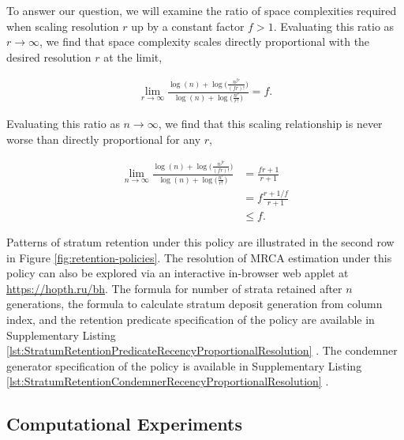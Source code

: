 To answer our question, we will examine the ratio of space complexities required when scaling resolution $r$ up by a constant factor $f > 1$.
Evaluating this ratio as $r \to \infty$, we find that space complexity scales directly proportional with the desired resolution $r$ at the limit,

\begin{align*}
\lim_{r \to \infty}
\frac{
  \log(n) + \log\Big(\frac{n^{fr}}{(fr)!}\Big)
}{
  \log(n) + \log\Big(\frac{n^r}{r!}\Big)
}
= f.
\end{align*}

Evaluating this ratio as $n \to \infty$, we find that this scaling relationship is never worse than directly proportional for any $r$,

\begin{align*}
\lim_{n \to \infty}
\frac{
  \log(n) + \log\Big(\frac{n^{fr}}{(fr)!}\Big)
}{
  \log(n) + \log\Big(\frac{n^r}{r!}\Big)
}
&= \frac{fr+1}{r+1}\\
&= f\frac{r + 1/f}{r + 1}\\
&\leq f.
\end{align*}

Patterns of stratum retention under this policy are illustrated in the second row in Figure \ref{fig:retention-policies}.
The resolution of MRCA estimation under this policy can also be explored via an interactive in-browser web applet at \url{https://hopth.ru/bh}.
The formula for number of strata retained after $n$ generations, the formula to calculate stratum deposit generation from column index, and the retention predicate specification of the policy are available in Supplementary Listing \ref{lst:StratumRetentionPredicateRecencyProportionalResolution} \citep{moreno2022hstratconceptsupplement}.
The condemner generator specification of the policy is available in Supplementary Listing \ref{lst:StratumRetentionCondemnerRecencyProportionalResolution} \citep{moreno2022hstratconceptsupplement}.

\subsection{Computational Experiments}

